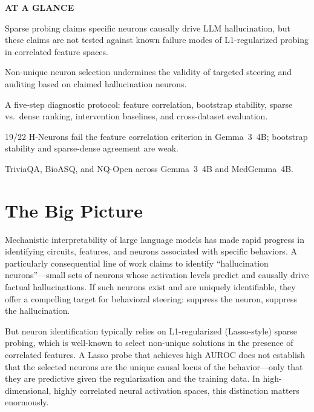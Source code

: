 \documentclass[10pt,twocolumn]{article}
\begin{document}
\begin{mdframed}[backgroundcolor=boxgray,linecolor=rulered,linewidth=1pt,
    innerleftmargin=6pt,innerrightmargin=6pt,
    innertopmargin=6pt,innerbottommargin=6pt]
\textbf{\small AT A GLANCE}\par\vspace{4pt}
\begin{description}[leftmargin=0pt,labelsep=4pt,itemsep=2pt,parsep=0pt,
    font=\small\bfseries]
  \item[Problem:] Sparse probing claims specific neurons causally drive LLM
    hallucination, but these claims are not tested against known failure modes
    of L1-regularized probing in correlated feature spaces.
  \item[Why it matters:] Non-unique neuron selection undermines the validity
    of targeted steering and auditing based on claimed hallucination neurons.
  \item[Method:] A five-step diagnostic protocol: feature correlation,
    bootstrap stability, sparse vs.\ dense ranking, intervention baselines,
    and cross-dataset evaluation.
  \item[Result:] 19/22 H-Neurons fail the feature correlation criterion in
    Gemma~3~4B; bootstrap stability and sparse-dense agreement are weak.
  \item[Evidence:] TriviaQA, BioASQ, and NQ-Open across Gemma~3~4B and
    MedGemma~4B.
\end{description}
\end{mdframed}

\section{The Big Picture}

Mechanistic interpretability of large language models has made rapid progress
in identifying circuits, features, and neurons associated with specific
behaviors. A particularly consequential line of work claims to identify
``hallucination neurons''---small sets of neurons whose activation levels
predict and causally drive factual hallucinations. If such neurons exist and
are uniquely identifiable, they offer a compelling target for behavioral
steering: suppress the neuron, suppress the hallucination.

But neuron identification typically relies on L1-regularized (Lasso-style)
sparse probing, which is well-known to select non-unique solutions in the
presence of correlated features. A Lasso probe that achieves high AUROC does
not establish that the selected neurons are the unique causal locus of the
behavior---only that they are predictive given the regularization and the
training data. In high-dimensional, highly correlated neural activation
spaces, this distinction matters enormously.
\end{document}
